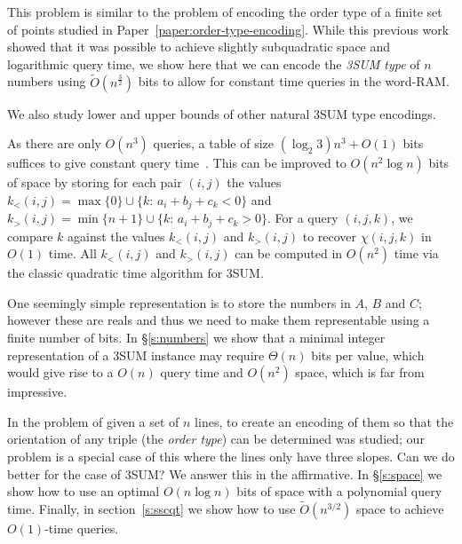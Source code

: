 This problem is similar to the problem of encoding the order
type of a finite set of points studied in Paper~\ref{paper:order-type-encoding}.
While this previous work showed that it was
possible to achieve slightly subquadratic space and logarithmic query time, we
show here that we can encode the \emph{3SUM type} of \(n\) numbers using
\(\tilde{O}(n^{\frac 32})\) bits to allow for constant time queries in the
word-RAM.

We also study lower and upper bounds of other natural 3SUM type encodings.

As there are only $O(n^3)$ queries, a table
of size $(\log_2 3) n^3 + O(1)$ bits suffices to give constant query time~\cite{DPT10}.
%
This can be improved to $O(n^2\log n)$ bits of space by
storing for each pair $(i,j)$ the values
\(k_<(i,j) = \max \{ 0\}\cup \{k \colon\, a_i + b_j + c_k < 0\}\) and
\(k_>(i,j) = \min \{ n+1\}\cup \{k \colon\, a_i + b_j + c_k > 0\}\).
For a query \((i,j,k)\), we compare \(k\) against the values \(k_<(i,j)\) and \(k_>(i,j)\)
to recover \(\chi(i,j,k)\) in \(O(1)\) time. All \(k_<(i,j)\) and \(k_>(i,j)\)
can be computed in \(O(n^2)\) time via the classic quadratic time algorithm for
3SUM.

One seemingly simple representation is to store the numbers in $A$, $B$ and
$C$; however these are reals and thus we need to make them representable using
a finite number of bits.
In \S\ref{s:numbers} we show that a minimal integer representation of a
3SUM instance may require $\Theta(n)$ bits per value, which would give
rise to a $O(n)$ query time and $O(n^2)$ space, which is far from
impressive.
%


In \cite{CCILO18} the problem of given a set of $n$ lines, to create an
encoding of them so that the orientation of any triple (the \emph{order type})
can be determined was studied; our problem is a special case of this where the
lines only have three slopes.
Can we do better for the case of 3SUM? We answer this in the affirmative.
In \S\ref{s:space} we show how to use an optimal $O(n \log n)$ bits of
space with a polynomial query time. Finally, in section~\ref{s:sscqt} we show
how to use $\tilde{O}(n^{3/2})$ space to achieve $O(1)$-time queries.



